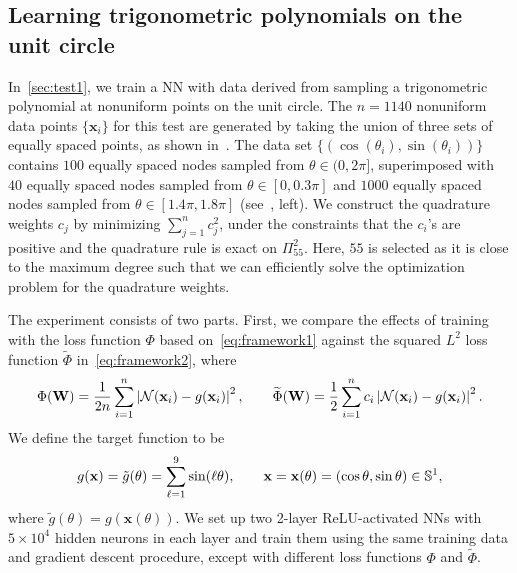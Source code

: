 \subsection{Learning trigonometric polynomials on the unit circle}
In~\cref{sec:test1}, we train a NN with data derived from sampling a trigonometric polynomial at nonuniform points on the unit circle.  The $n = 1140$ nonuniform data points $\{\mathbf{x}_i\}$ for this test are generated by taking the union of three sets of equally spaced points,
as shown in~. The data set $\{(\cos(\theta_i), \sin(\theta_i))\}$ contains $100$ equally spaced nodes sampled from $\theta \in (0,2\pi]$, superimposed with $40$ equally spaced nodes sampled from $\theta \in [0,0.3\pi]$ and $1000$ equally spaced nodes sampled from $\theta \in [1.4\pi,1.8\pi]$ (see~, left). We construct the quadrature weights $c_j$ by minimizing $\sum_{j=1}^n c_j^2$, under the constraints that the $c_i$'s are positive and the quadrature rule is exact on $\Pi^{2}_{55}$. Here, $55$ is selected as it is close to the maximum degree such that we can efficiently solve the optimization problem for the quadrature weights. 

The experiment consists of two parts. First, we compare the effects of training with the loss function $\Phi$ based on~\cref{eq:framework1} against the squared $L^2$ loss function $\widetilde \Phi$ in~\cref{eq:framework2}, where
\begin{equation*}
    \Phi(\mathbf{W}) = \frac{1}{2n}\sum_{i=1}^n \left|\mathcal{N}(\mathbf{x}_i) - g(\mathbf{x}_i)\right|^2, \qquad \widetilde \Phi(\mathbf{W}) = \frac{1}{2}\sum_{i=1}^n c_i \left|\mathcal{N}(\mathbf{x}_i) - g(\mathbf{x}_i)\right|^2.
\end{equation*}
We define the target function to be
\begin{equation*}
   g(\mathbf{x}) =  \tilde{g}(\theta) = \sum_{\ell=1}^9 \sin(\ell \theta), \qquad \mathbf{x} = \mathbf{x}(\theta) = (\cos\theta, \sin\theta) \in {\mathbb{S}}^1,
\end{equation*}
where $\tilde{g}(\theta) = g( \mathbf{x}(\theta))$. We set up two 2-layer ReLU-activated NNs with $5\times 10^4$ hidden neurons in each layer and train them using the same training data and gradient descent procedure, except with different loss functions $\Phi$ and $\widetilde \Phi$.

